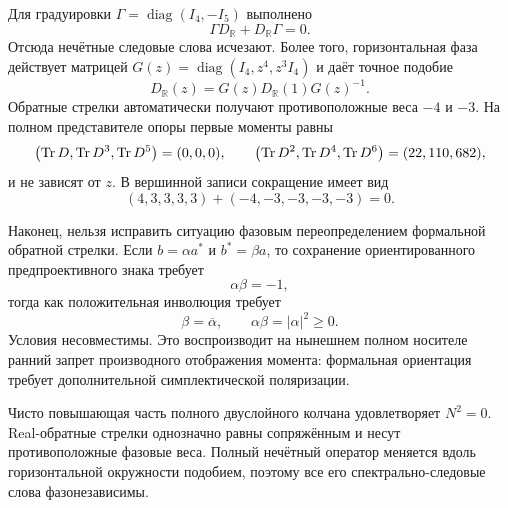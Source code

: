 Для градуировки $\Gamma=\operatorname{diag}(I_4,-I_5)$ выполнено
\begin{equation}
 \Gamma D_{\mathbb R}+D_{\mathbb R}\Gamma=0.
 \label{eq:v8-real-oriented-odd-grading}
\end{equation}
Отсюда нечётные следовые слова исчезают. Более того, горизонтальная фаза
действует матрицей
$G(z)=\operatorname{diag}(I_4,z^4,z^3I_4)$ и даёт точное подобие
\begin{equation}
 D_{\mathbb R}(z)=G(z)D_{\mathbb R}(1)G(z)^{-1}.
 \label{eq:v8-real-oriented-phase-similarity}
\end{equation}
Обратные стрелки автоматически получают противоположные веса $-4$ и $-3$.
На полном представителе опоры первые моменты равны
\begin{equation}
 \bigl(\operatorname{Tr} D,\operatorname{Tr} D^3,\operatorname{Tr} D^5\bigr)=(0,0,0),
 \qquad
 \bigl(\operatorname{Tr} D^2,\operatorname{Tr} D^4,\operatorname{Tr} D^6\bigr)=(22,110,682),
 \label{eq:v8-real-oriented-trace-moments}
\end{equation}
и не зависят от $z$. В вершинной записи сокращение имеет вид
\begin{equation}
 (4,3,3,3,3)+(-4,-3,-3,-3,-3)=0.
 \label{eq:v8-real-oriented-charge-cancellation}
\end{equation}

Наконец, нельзя исправить ситуацию фазовым переопределением формальной
обратной стрелки. Если $b=\alpha a^*$ и $b^*=\beta a$, то сохранение
ориентированного предпроективного знака требует
\begin{equation}
 \alpha\beta=-1,
 \label{eq:v8-real-oriented-formal-sign}
\end{equation}
тогда как положительная инволюция требует
\begin{equation}
 \beta=\overline\alpha,
 \qquad
 \alpha\beta=|\alpha|^2\geq0.
 \label{eq:v8-real-oriented-positive-involution}
\end{equation}
Условия несовместимы. Это воспроизводит на нынешнем полном носителе ранний
запрет производного отображения момента: формальная ориентация требует
дополнительной симплектической поляризации.

\begin{theorem}
Чисто повышающая часть полного двуслойного колчана удовлетворяет $N^2=0$.
Real-обратные стрелки однозначно равны сопряжённым и несут противоположные
фазовые веса. Полный нечётный оператор меняется вдоль горизонтальной
окружности подобием, поэтому все его спектрально-следовые слова фазонезависимы.
\end{theorem}

